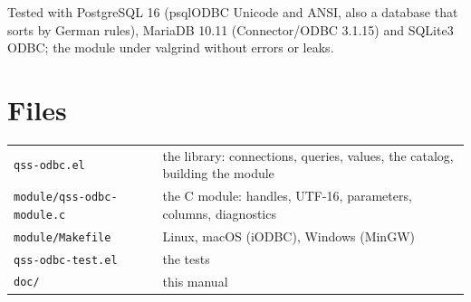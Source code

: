 \documentclass[
  paper=a4, fontsize=11pt, parskip=half, headings=small,
  toc=bibliography, numbers=noenddot, DIV=12
]{scrreprt}
\newcommand{\file}[1]{\texttt{#1}}
\begin{document}
Tested with PostgreSQL 16 (psqlODBC Unicode and ANSI, also a database that
sorts by German rules), MariaDB 10.11 (Connector/ODBC 3.1.15) and SQLite3
ODBC; the module under valgrind without errors or leaks.

\chapter{Files}

\noindent\begin{tabularx}{\linewidth}{@{}lX@{}}
\toprule
\file{qss-odbc.el} & the library: connections, queries, values, the catalog, building the module \\
\file{module/qss-odbc-module.c} & the C module: handles, UTF-16, parameters, columns, diagnostics \\
\file{module/Makefile} & Linux, macOS (iODBC), Windows (MinGW) \\
\file{qss-odbc-test.el} & the tests \\
\file{doc/} & this manual \\
\bottomrule
\end{tabularx}
\end{document}
